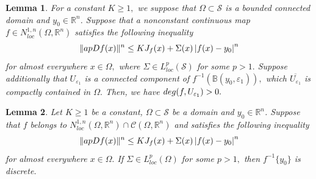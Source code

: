 \documentclass[10pt,a4paper]{amsart}
\newtheorem{lem}{Lemma}
\newcommand{\abs}[1]{\left|#1\right|}
\begin{document}
\begin{lem}\label{bgjxolohcn}
For a constant $K\geq1,$ we suppose that $\Omega\subset\mathcal{S}$ is a bounded connected domain and $y_{0}\in\mathbb{R}^{n}$. Suppose that a nonconstant continuous map $f\in N_{loc}^{1,n}(\Omega,\mathbb{R}^{n})$ 
 satisfies the following inequality
\begin{equation}\label{jjksxc}
\| {\rm ap}Df(x)\|^{n}\leq KJ_{f}(x)+\Sigma(x)\abs{f(x)-y_{0}}^{n}
\end{equation}
for almost everywhere $x\in\Omega,$ where  $\Sigma\in L_{loc}^{p}(\mathcal{S})$ for some $p>1.$   Suppose additionally that $U_{\varepsilon_{1}}$ is a connected component of $f^{-1}(\mathbb{B}(y_{0},\varepsilon_{1})),$ which $\overline{U_{\varepsilon_{1}}}$ is compactly contained in $\Omega.$ Then, we have
${\rm deg}(f,U_{\varepsilon_{1}})>0.$
\end{lem}

\begin{lem}\label{th11000dsvfffbvd}
Let $K\geq1$ be a constant, $\Omega\subset\mathcal{S}$ be a domain and $y_{0}\in\mathbb{R}^{n}$. Suppose that $f$ belongs to  $N_{loc}^{1,n}(\Omega,\mathbb{R}^{n})\cap \mathcal{C}(\Omega,\mathbb{R}^{n})$ and satisfies the following inequality
\begin{equation}
\| {\rm ap}Df(x)\|^{n}\leq KJ_{f}(x)+\Sigma(x)\abs{f(x)-y_{0}}^{n}
\end{equation}
for almost everywhere $x\in\Omega.$ If $\Sigma\in L_{loc}^{p}(\Omega)$ for some $p>1,$  then $f^{-1}\{y_{0}\}$ is discrete.
\end{lem}
\end{document}
